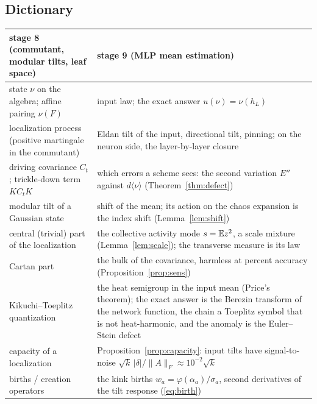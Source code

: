 \label{sec:dictionary}
\subsection{Dictionary}
\begin{center}\small
\begin{tabular}{p{}p{}}\toprule
stage 8 (commutant, modular tilts, leaf space) & stage 9 (\textsc{MLP} mean estimation)\\\midrule
state $\nu$ on the algebra; affine pairing $\nu(F)$ & input law; the exact answer $u(\nu)=\nu(h_L)$\\
localization process (positive martingale in the commutant) & Eldan tilt of the input, directional tilt, pinning; on the neuron side, the layer-by-layer closure\\
driving covariance $C_t$; trickle-down term $KC_tK$ & which errors a scheme sees: the second variation $E''$ against $d\langle\nu\rangle$ (Theorem~\ref{thm:defect})\\
modular tilt of a Gaussian state & shift of the mean; its action on the chaos expansion is the index shift (Lemma~\ref{lem:shift})\\
central (trivial) part of the localization & the collective activity mode $s=\mathbb E z^2$, a scale mixture (Lemma~\ref{lem:scale}); the transverse measure is its law\\
Cartan part & the bulk of the covariance, harmless at percent accuracy (Proposition~\ref{prop:sens})\\
Kikuchi--Toeplitz quantization & the heat semigroup in the input mean (Price's theorem); the exact answer is the Berezin transform of the network function, the chain a Toeplitz symbol that is not heat-harmonic, and the anomaly is the Euler--Stein defect\\
capacity of a localization & Proposition~\ref{prop:capacity}: input tilts have signal-to-noise $\sqrt k\,|\delta|/\|A\|_F\approx10^{-2}\sqrt k$\\
births / creation operators & the kink births $w_a=\varphi(\alpha_a)/\sigma_a$, second derivatives of the tilt response (\eqref{eq:birth})\\
\bottomrule\end{tabular}
\end{center}

